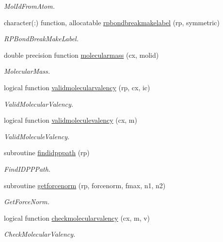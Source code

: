 \begin{DoxyCompactItemize}
\begin{DoxyCompactList}\small\item\em Mol\+Id\+From\+Atom. \end{DoxyCompactList}\item 
character(\+:) function, allocatable \mbox{\hyperlink{namespacerpath_acfcfa66e72c2f1bd9fd7605b1dbf0c9c}{rpbondbreakmakelabel}} (rp, symmetric)
\begin{DoxyCompactList}\small\item\em R\+P\+Bond\+Break\+Make\+Label. \end{DoxyCompactList}\item 
double precision function \mbox{\hyperlink{namespacerpath_a6790b5358cce92bedc4c75dab38d780d}{molecularmass}} (cx, molid)
\begin{DoxyCompactList}\small\item\em Molecular\+Mass. \end{DoxyCompactList}\item 
logical function \mbox{\hyperlink{namespacerpath_ac1b5ae45f749a370ebab759dbaeeefd7}{validmolecularvalency}} (rp, cx, ic)
\begin{DoxyCompactList}\small\item\em Valid\+Molecular\+Valency. \end{DoxyCompactList}\item 
logical function \mbox{\hyperlink{namespacerpath_af041cd0a3cf96707ba0d0588a00c9e0f}{validmoleculevalency}} (cx, m)
\begin{DoxyCompactList}\small\item\em Valid\+Molecule\+Valency. \end{DoxyCompactList}\item 
subroutine \mbox{\hyperlink{namespacerpath_a3c3083be4489b8e7ed7330dcc26fb62f}{findidpppath}} (rp)
\begin{DoxyCompactList}\small\item\em Find\+I\+D\+P\+P\+Path. \end{DoxyCompactList}\item 
subroutine \mbox{\hyperlink{namespacerpath_a691c70e4854e7529a7b85e69491cdccc}{getforcenorm}} (rp, forcenorm, fmax, n1, n2)
\begin{DoxyCompactList}\small\item\em Get\+Force\+Norm. \end{DoxyCompactList}\item 
logical function \mbox{\hyperlink{namespacerpath_a5c4298880a886889f8edc93c7735c5b1}{checkmolecularvalency}} (cx, m, v)
\begin{DoxyCompactList}\small\item\em Check\+Molecular\+Valency. \end{DoxyCompactList}\item 

\end{DoxyCompactItemize}
